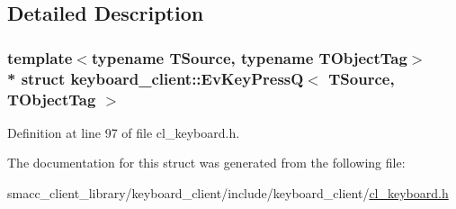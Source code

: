 \subsection{Detailed Description}
\subsubsection*{template$<$typename T\+Source, typename T\+Object\+Tag$>$\\*
struct keyboard\+\_\+client\+::\+Ev\+Key\+Press\+Q$<$ T\+Source, T\+Object\+Tag $>$}



Definition at line 97 of file cl\+\_\+keyboard.\+h.



The documentation for this struct was generated from the following file\+:\begin{DoxyCompactItemize}
\item 
smacc\+\_\+client\+\_\+library/keyboard\+\_\+client/include/keyboard\+\_\+client/\hyperlink{cl__keyboard_8h}{cl\+\_\+keyboard.\+h}\end{DoxyCompactItemize}
